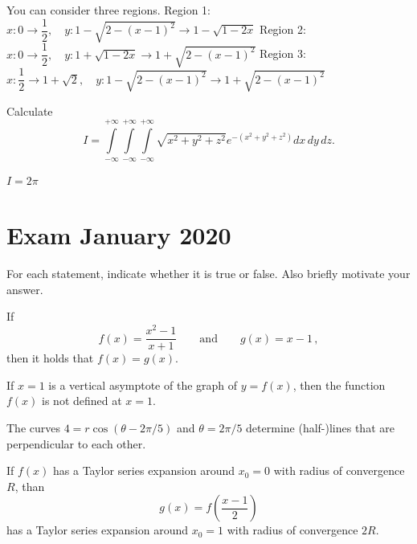 \begin{Answer}

\Question[]You can consider three regions.
\Question Region 1: $x: 0 \rightarrow \dfrac{1}{2}, \quad y: 1 - \sqrt{2-(x-1)^2} \rightarrow 1 - \sqrt{1-2x}$
\Question Region 2: $x: 0 \rightarrow \dfrac{1}{2}, \quad y: 1 + \sqrt{1-2x} \rightarrow 1 + \sqrt{2-(x-1)^2}$
\Question Region 3: $x: \dfrac{1}{2} \rightarrow 1+\sqrt{2}, \quad y: 1 - \sqrt{2-(x-1)^2} \rightarrow 1 + \sqrt{2-(x-1)^2}$

\end{Answer}



\begin{Exercise} %
Calculate
$$
I = \int\limits_{-\infty}^{+\infty}\int\limits_{-\infty}^{+\infty}\int\limits_{-\infty}^{+\infty}\sqrt{x^2+y^2+z^2}e^{-\left(x^2+y^2+z^2\right)} dx\,dy\,dz.
$$
\end{Exercise}
\begin{Answer}
$I = 2 \pi$

\end{Answer}



\section{Exam January 2020}

\begin{Exercise} %
For each statement, indicate whether it is true or false. Also briefly motivate your answer.

\Question If
    $$
    f(x)=\dfrac{x^2-1}{x+1}\qquad\text{and}\qquad g(x)=x-1\,,
    $$
    then it holds that $f(x)=g(x)$.
	
\Question If $x=1$ is a vertical asymptote of the graph of $y=f(x)$, then the function $f(x)$ is not defined at $x=1$.

\Question The curves $4=r\cos(\theta-2\pi/5)$ and $\theta = 2 \pi/5 $ determine (half-)lines that are perpendicular to each other.

\Question If $f(x)$ has a Taylor series expansion around $x_0=0$ with radius of convergence $R$, than
    $$
    g(x) = f\left(\frac{x-1}{2}\right)
    $$
    has a Taylor series expansion around $x_0=1$ with radius of convergence $2R$.
\EndCurrentQuestion
\end{Exercise}

